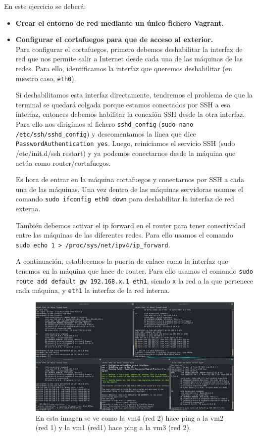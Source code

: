 \documentclass[12pt,letterpaper]{article}
\begin{document}
En este ejercicio se deberá:
\begin{itemize}
	\item \textbf{Crear el entorno de red mediante un único fichero Vagrant.}
	
	
	\item \textbf{Configurar el cortafuegos para que de acceso al exterior.} \\
	Para configurar el cortafuegos, primero debemos deshabilitar la interfaz de red que nos permite salir a Internet desde cada una de las máquinas de las redes. Para ello, identificamos la interfaz que queremos deshabilitar (en nuestro caso, \texttt{eth0}).
	
	Si deshabilitamos esta interfaz directamente, tendremos el problema de que la terminal se quedará colgada porque estamos conectados por SSH a esa interfaz, entonces debemos habilitar la conexión SSH desde la otra interfaz. Para ello nos dirigimos al fichero \texttt{sshd\_config} (\texttt{sudo nano /etc/ssh/sshd\_config}) y descomentamos la línea que dice \\\texttt{PasswordAuthentication yes}. Luego, reiniciamos el servicio SSH (sudo /etc/init.d/ssh restart) y ya podemos conectarnos desde la máquina que actúa como router/cortafuegos.
	
	Es hora de entrar en la máquina cortafuegos y conectarnos por SSH a cada una de las máquinas. Una vez dentro de las máquinas servidoras usamos el comando \texttt{sudo ifconfig eth0 down} para deshabilitar la interfaz de red externa.
	
	También debemos activar el ip forward en el router para tener conectividad entre las máquinas de las diferentes redes. Para ello usamos el comando\\\texttt{sudo echo 1 > /proc/sys/net/ipv4/ip\_forward}.
	
	A continuación, establecemos la puerta de enlace como la interfaz que tenemos en la máquina que hace de router. Para ello usamos el comando \texttt{sudo route add default gw 192.168.x.1 eth1}, siendo \texttt{x} la red a la que pertenece cada máquina, y \texttt{eth1} la interfaz de la red interna.
	
	\begin{figure}[h]
		\centering
		\includegraphics[scale=0.25]{Ping.png}
		\caption{En esta imagen se ve como la vm4 (red 2) hace ping a la vm2 (red 1) y la vm1 (red1) hace ping a la vm3 (red 2).}
	\end{figure}
	

\end{itemize}
\end{document}
